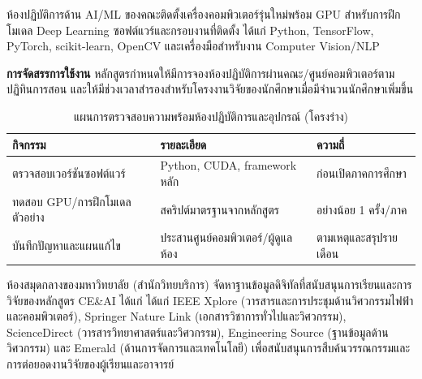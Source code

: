 
ห้องปฏิบัติการด้าน AI/ML ของคณะติดตั้งเครื่องคอมพิวเตอร์รุ่นใหม่พร้อม GPU สำหรับการฝึกโมเดล Deep Learning ซอฟต์แวร์และกรอบงานที่ติดตั้ง ได้แก่ Python, TensorFlow, PyTorch, scikit-learn, OpenCV และเครื่องมือสำหรับงาน Computer Vision/NLP

\textbf{การจัดสรรการใช้งาน} หลักสูตรกำหนดให้มีการจองห้องปฏิบัติการผ่านคณะ/ศูนย์คอมพิวเตอร์ตามปฏิทินการสอน และให้มีช่วงเวลาสำรองสำหรับโครงงานวิจัยของนักศึกษาเมื่อมีจำนวนนักศึกษาเพิ่มขึ้น

\begin{table}[H]
  \centering
  \caption{แผนการตรวจสอบความพร้อมห้องปฏิบัติการและอุปกรณ์ (โครงร่าง)}
  \label{tbl:c7_lab_readiness}
  \begingroup
  \small
  \begin{tabularx}{\linewidth}{|>{\raggedright\arraybackslash}p{3.0cm}|Y|>{\centering\arraybackslash}p{2.4cm}|}
    \hline
    \textbf{กิจกรรม} & \textbf{รายละเอียด} & \textbf{ความถี่} \\
    \hline
    ตรวจสอบเวอร์ชันซอฟต์แวร์ & Python, CUDA, framework หลัก & ก่อนเปิดภาคการศึกษา \\
    \hline
    ทดสอบ GPU/การฝึกโมเดลตัวอย่าง & สคริปต์มาตรฐานจากหลักสูตร & อย่างน้อย 1 ครั้ง/ภาค \\
    \hline
    บันทึกปัญหาและแผนแก้ไข & ประสานศูนย์คอมพิวเตอร์/ผู้ดูแลห้อง & ตามเหตุและสรุปรายเดือน \\
    \hline
  \end{tabularx}
  \endgroup
\end{table}



ห้องสมุดกลางของมหาวิทยาลัย (สำนักวิทยบริการ) จัดหาฐานข้อมูลดิจิทัลที่สนับสนุนการเรียนและการวิจัยของหลักสูตร CE\&AI ได้แก่
ได้แก่ IEEE Xplore (วารสารและการประชุมด้านวิศวกรรมไฟฟ้าและคอมพิวเตอร์), Springer Nature Link (เอกสารวิชาการทั่วไปและวิศวกรรม), ScienceDirect (วารสารวิทยาศาสตร์และวิศวกรรม), Engineering Source (ฐานข้อมูลด้านวิศวกรรม) และ Emerald (ด้านการจัดการและเทคโนโลยี) เพื่อสนับสนุนการสืบค้นวรรณกรรมและการต่อยอดงานวิจัยของผู้เรียนและอาจารย์

